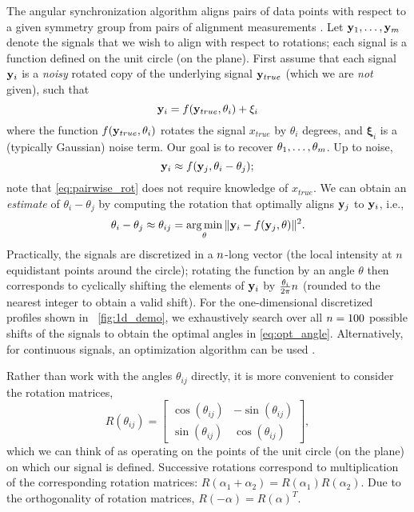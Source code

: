 The angular synchronization algorithm aligns pairs of data points with respect to a given symmetry group from pairs of alignment measurements \citep{singer2011angular}. 
%
Let $ \mathbf{y}_1, \dots, \mathbf{y}_m$ denote the signals that we wish to align with respect to rotations;
each signal is a function defined on the unit circle (on the plane).
%
First assume that each signal $\mathbf{y}_i$ is a {\it noisy} rotated copy of the underlying signal $\mathbf{y}_{true}$
(which we are {\it not} given), such that
\begin{equation}
\mathbf{y}_i = f(\mathbf{y}_{true}, \theta_i) + \mathbf{\xi}_i
\end{equation}
where the function $f(\mathbf{y}_{true}, \theta_i)$ rotates the signal $x_{true}$ by $\theta_i$ degrees, and $\mathbf{\xi}_i$ is a (typically Gaussian) noise term.
%
Our goal is to recover $\theta_1, \dots, \theta_m$.
%
Up to noise,
\begin{equation} \label{eq:pairwise_rot}
\mathbf{y}_i \approx f(\mathbf{y}_j, \theta_i - \theta_j) ;
\end{equation}
note that \eqref{eq:pairwise_rot} does not require knowledge of $x_{true}$.
%
We can obtain an {\it estimate} of $\theta_i - \theta_j$ by computing the rotation that optimally aligns $\mathbf{y}_j$ to $\mathbf{y}_i$,
i.e., %
%
\begin{equation} \label{eq:opt_angle}
\theta_i - \theta_j \approx \theta_{ij} = \operatorname*{arg\,min}_{\theta} \|\mathbf{y}_i - f(\mathbf{y}_j, \theta)\|^2.
\end{equation}
%
Practically, the signals are discretized in a $n$-long vector (the local intensity at $n$ equidistant points around the circle);
rotating the function by an angle $\theta$ then corresponds to cyclically shifting the elements of $\mathbf{y}_i$
by $\frac{\theta_i}{2 \pi} n$ (rounded to the nearest integer to obtain a valid shift).
%
For the one-dimensional discretized profiles shown in \fig~\ref{fig:1d_demo}, we exhaustively search over all $n=100$ possible shifts of the signals to obtain the optimal angles in \eqref{eq:opt_angle}.
%
Alternatively, for continuous signals, an optimization algorithm
can be used \citep{ahuja2007template}.

Rather than work with the angles $\theta_{ij}$ directly, it is more convenient to consider the rotation matrices,
\begin{equation} \label{eq:R_theta}
R(\theta_{ij}) = \begin{bmatrix}
\cos(\theta_{ij}) & -\sin(\theta_{ij}) \\
\sin(\theta_{ij}) & \cos(\theta_{ij})
\end{bmatrix},
\end{equation}
which we can think of as operating on the points of the unit circle (on the plane) on which our signal is defined.
%
Successive rotations correspond to multiplication of the corresponding rotation matrices: $R(\alpha_1 + \alpha_2) = R(\alpha_1) R(\alpha_2)$.
%
Due to the orthogonality of rotation matrices, $R(-\alpha) = R(\alpha)^T$.

